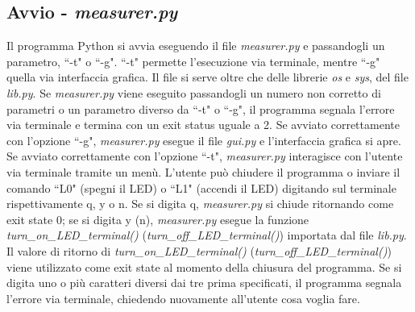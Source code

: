 \documentclass[a4paper]{article}
\begin{document}
\subsection{Avvio - \textit{measurer.py}}
Il programma Python si avvia eseguendo il file \textit{measurer.py} e passandogli un parametro, ``-t" o ``-g". ``-t" permette l'esecuzione via terminale, mentre ``-g" quella via interfaccia grafica. Il file si serve oltre che delle librerie \textit{os} e \textit{sys}, del file \textit{lib.py}.
\newline 
Se \textit{measurer.py} viene eseguito passandogli un numero non corretto di parametri o un parametro diverso da ``-t" o ``-g", il programma segnala l'errore via terminale e termina con un exit status uguale a 2. Se avviato correttamente con l'opzione ``-g", \textit{measurer.py} esegue il file \textit{gui.py} e l'interfaccia grafica si apre.
\newline
Se avviato correttamente con l'opzione ``-t", \textit{measurer.py} interagisce con l'utente via terminale tramite un men\`{u}. L'utente pu\`{o} chiudere il programma o inviare il comando ``L0" (spegni il LED) o ``L1" (accendi il LED) digitando sul terminale rispettivamente q, y o n. Se si digita q, \textit{measurer.py} si chiude ritornando come exit state 0; se si digita y (n), \textit{measurer.py} esegue la funzione \textit{turn\_on\_LED\_terminal()} (\textit{turn\_off\_LED\_terminal()}) importata dal file \textit{lib.py}.  Il valore di ritorno di \textit{turn\_on\_LED\_terminal()} (\textit{turn\_off\_LED\_terminal()}) viene utilizzato come exit state al momento della chiusura del programma. Se si digita uno o pi\`{u} caratteri diversi dai tre prima specificati, il programma segnala l'errore via terminale, chiedendo nuovamente all'utente cosa voglia fare.
\end{document}
